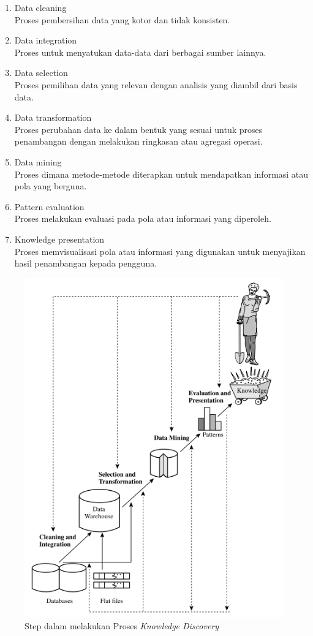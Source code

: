 \begin{enumerate}
	\item Data cleaning \\Proses pembersihan data yang kotor dan tidak konsisten.
	\item Data integration \\Proses untuk menyatukan data-data dari berbagai sumber lainnya.
	\item Data selection \\Proses pemilihan data yang relevan dengan analisis yang diambil dari basis data.
	\item Data transformation \\Proses perubahan data ke dalam bentuk yang sesuai untuk proses penambangan dengan melakukan ringkasan atau agregasi operasi.
	\item Data mining \\Proses dimana metode-metode diterapkan untuk mendapatkan informasi atau pola yang berguna.
	\item Pattern evaluation \\Proses melakukan evaluasi pada pola atau informasi yang diperoleh.
	\item Knowledge presentation \\Proses memvisualisasi pola atau informasi yang digunakan untuk menyajikan hasil penambangan kepada pengguna.
\end{enumerate}


\begin{figure}
\centering
\includegraphics[scale=0.5]{Gambar/data-mini-process.png}
\caption[Step dalam melakukan Proses \textit{Knowledge Discovery}]{Step dalam melakukan Proses \textit{Knowledge Discovery} \cite{han2011data}} 
\end{figure}


